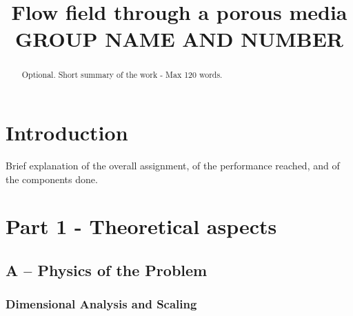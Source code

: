 \documentclass[conference,compsoc]{IEEEtran}
\begin{document}
%
\title{Flow field through a porous media\\
GROUP NAME AND NUMBER}


\author{
\and
{}
\and
{}
}


\maketitle
\thispagestyle{plain}
\pagestyle{plain}

\begin{abstract}
Optional. Short summary of the work - Max 120 words.
\end{abstract}





\section{Introduction}
Brief explanation of the overall assignment, of the performance reached, and of the components done.

\section{Part 1 - Theoretical aspects}

\subsection*{A -- Physics of the Problem}

\subsubsection{Dimensional Analysis and Scaling}
\end{document}
